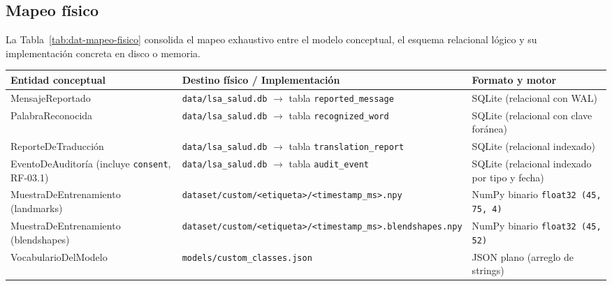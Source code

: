 \subsection{Mapeo físico}
\label{sec:dat-mapeo-fisico}

La Tabla~\ref{tab:dat-mapeo-fisico} consolida el mapeo exhaustivo entre el
modelo conceptual, el esquema relacional lógico y su implementación concreta
en disco o memoria.

\small
\begin{longtable}{>{\raggedright\arraybackslash}p{4.0cm} >{\raggedright\arraybackslash}p{4.8cm} >{\raggedright\arraybackslash}p{5.0cm}}
    \toprule
    \textbf{Entidad conceptual} & \textbf{Destino físico / Implementación} & \textbf{Formato y motor} \\
    \midrule
    \endhead
    MensajeReportado &
    \texttt{data/lsa\_salud.db} $\rightarrow$ tabla \texttt{reported\_message} &
    SQLite (relacional con WAL) \\

    PalabraReconocida &
    \texttt{data/lsa\_salud.db} $\rightarrow$ tabla \texttt{recognized\_word} &
    SQLite (relacional con clave foránea) \\

    ReporteDeTraducción &
    \texttt{data/lsa\_salud.db} $\rightarrow$ tabla \texttt{translation\_report} &
    SQLite (relacional indexado) \\

    EventoDeAuditoría (incluye \texttt{consent}, RF-03.1) &
    \texttt{data/lsa\_salud.db} $\rightarrow$ tabla \texttt{audit\_event} &
    SQLite (relacional indexado por tipo y fecha) \\

    MuestraDeEntrenamiento (landmarks) &
    \texttt{dataset/\allowbreak custom/\allowbreak <etiqueta>/\allowbreak <timestamp\_ms>.npy} &
    NumPy binario \texttt{float32 (45, 75, 4)} \\

    MuestraDeEntrenamiento (blendshapes) &
    \texttt{dataset/\allowbreak custom/\allowbreak <etiqueta>/\allowbreak <timestamp\_ms>.blendshapes.npy} &
    NumPy binario \texttt{float32 (45, 52)} \\

    VocabularioDelModelo &
    \texttt{models/\allowbreak custom\_classes.json} &
    JSON plano (arreglo de strings) \\


\end{longtable}

